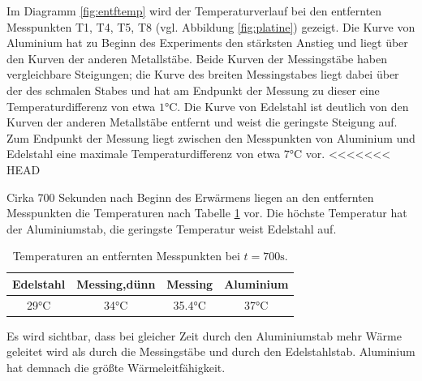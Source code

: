 Im Diagramm \ref{fig:entftemp} wird der Temperaturverlauf bei den entfernten Messpunkten T1, T4, T5, T8 (vgl. Abbildung \ref{fig:platine}) gezeigt. 
Die Kurve von Aluminium hat zu Beginn des Experiments den stärksten Anstieg und liegt über den Kurven der anderen Metallstäbe. 
Beide Kurven der Messingstäbe haben vergleichbare Steigungen;
die Kurve des breiten Messingstabes liegt dabei über der des schmalen Stabes und hat am Endpunkt der Messung zu dieser eine Temperaturdifferenz von etwa $1 \si{\degreeCelsius}$. 
Die Kurve von Edelstahl ist deutlich von den Kurven der anderen Metallstäbe entfernt und weist die geringste Steigung auf. 
Zum Endpunkt der Messung liegt zwischen den Messpunkten von Aluminium und Edelstahl eine maximale Temperaturdifferenz von etwa $7 \si{\degreeCelsius}$ vor. 
<<<<<<< HEAD

Cirka 700 Sekunden nach Beginn des Erwärmens liegen an den entfernten Messpunkten die Temperaturen nach Tabelle \ref{tab:700} vor. Die höchste Temperatur hat der Aluminiumstab, die geringste Temperatur weist Edelstahl auf.
\begin{table}
	\centering
	\begin{tabular}{cccc}
	\toprule
	{Edelstahl}&{Messing,dünn}&{Messing}&{Aluminium}\\
	\midrule
	29$\si{\degreeCelsius}$& 34$\si{\degreeCelsius}$& 35.4$\si{\degreeCelsius}$& 37$\si{\degreeCelsius}$\\
	\bottomrule
	\end{tabular}
	\caption{Temperaturen an entfernten Messpunkten bei $t=700\si{\second}$.}
\label{tab:700}
\end{table}

Es wird sichtbar, dass bei gleicher Zeit durch den Aluminiumstab mehr Wärme geleitet wird als durch die Messingstäbe und durch den Edelstahlstab. 
Aluminium hat demnach die größte Wärmeleitfähigkeit.

